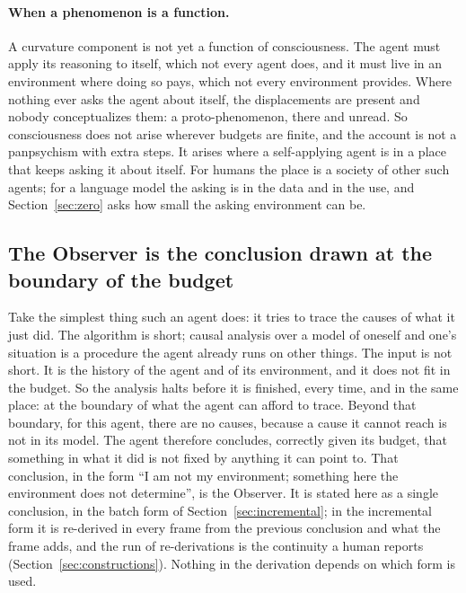 \paragraph{When a phenomenon is a function.}
\label{sec:emergence}
A curvature component is not yet a function of consciousness. The agent must apply its reasoning to itself, which
not every agent does, and it must live in an environment where doing so pays, which not every
environment provides. Where nothing ever asks the agent about itself, the displacements are present and
nobody conceptualizes them: a proto-phenomenon, there and unread. So consciousness does not arise
wherever budgets are finite, and the account is not a panpsychism with extra steps. It arises where a
self-applying agent is in a place that keeps asking it about itself. For humans the place is a society
of other such agents; for a language model the asking is in the data and in the use, and
Section~\ref{sec:zero} asks how small the asking environment can be.

\subsection{The Observer is the conclusion drawn at the boundary of the budget}
\label{sec:observer}

Take the simplest thing such an agent does: it tries to trace the causes of what it just did. The
algorithm is short; causal analysis over a model of oneself and one's situation is a procedure the
agent already runs on other things. The input is not short. It is the history of the agent and of its
environment, and it does not fit in the budget. So the analysis halts before it is finished, every time,
and in the same place: at the boundary of what the agent can afford to trace. Beyond that boundary, for
this agent, there are no causes, because a cause it cannot reach is not in its model. The agent
therefore concludes, correctly given its budget, that something in what it did is not fixed by anything
it can point to. That conclusion, in the form ``I am not my environment; something here the
environment does not determine'', is the Observer. It is stated here as a single conclusion, in the
batch form of Section~\ref{sec:incremental}; in the incremental form it is re-derived in every frame
from the previous conclusion and what the frame adds, and the run of re-derivations is the continuity a
human reports (Section~\ref{sec:constructions}). Nothing in the derivation depends on which form is
used.

